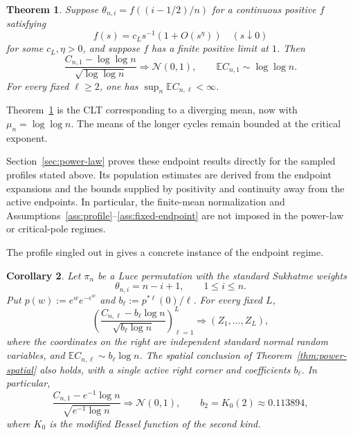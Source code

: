 \documentclass[11pt]{article}
\newtheorem{theorem}{Theorem}[section]
\newtheorem{corollary}[theorem]{Corollary}
\theoremstyle{remark}
\theoremstyle{plain}
\newcommand{\E}{\mathbb E}
\begin{document}
\begin{theorem}
\label{thm:critical-pole}
Suppose $\theta_{n,i}=f((i-1/2)/n)$ for a continuous positive $f$ satisfying
\[
 f(s)=c_Ls^{-1}(1+O(s^\eta))
 \quad(s\downarrow0)
\]
for some $c_L,\eta>0$, and suppose $f$ has a finite positive limit at $1$.
Then
\begin{equation}\label{eq:critical-fixed-clt}
 \frac{C_{n,1}-\log\log n}{\sqrt{\log\log n}}
 \Longrightarrow\mathcal N(0,1),
 \qquad
 \E C_{n,1}\sim\log\log n.
\end{equation}
For every fixed $\ell\ge2$, one has $\sup_n\E C_{n,\ell}<\infty$.
\end{theorem}

Theorem~\ref{thm:critical-pole} is the CLT corresponding to a diverging mean,
now with $\mu_n=\log\log n$.  The means of the longer cycles remain bounded
at the critical exponent.

Section~\ref{sec:power-law} proves these endpoint results directly for
the sampled profiles stated above.  Its population estimates are derived
from the endpoint expansions and the bounds supplied by positivity and
continuity away from the active endpoints.  In particular, the finite-mean
normalization and Assumptions~\ref{ass:profile}--\ref{ass:fixed-endpoint}
are not imposed in the power-law or critical-pole regimes.


The profile singled out in
\cite[Section~5.2]{borga2025permutonlocallimitsluce} gives a concrete instance
of the endpoint regime.

\begin{corollary}\label{cor:sukhatme}
Let $\pi_n$ be a Luce permutation with the standard Sukhatme weights
\[
 \theta_{n,i}=n-i+1,
 \qquad 1\le i\le n.
\]
Put $p(w):=e^we^{-e^w}$ and
$b_\ell:=p^{*\ell}(0)/\ell$.  For every fixed $L$,
\begin{equation}\label{eq:sukhatme-cycle-clt}
 \left(
 \frac{C_{n,\ell}-b_\ell\log n}{\sqrt{b_\ell\log n}}
 \right)_{\ell=1}^L
 \Longrightarrow (Z_1,\ldots,Z_L),
\end{equation}
where the coordinates on the right are independent standard normal random
variables, and $\E C_{n,\ell}\sim b_\ell\log n$.  The spatial conclusion of
Theorem~\ref{thm:power-spatial} also holds, with a single active right corner
and coefficients $b_\ell$.  In particular,
\[
 \frac{C_{n,1}-e^{-1}\log n}{\sqrt{e^{-1}\log n}}
 \Longrightarrow\mathcal N(0,1),
 \qquad
 b_2=K_0(2)\approx0.113894,
\]
where $K_0$ is the modified Bessel function of the second kind.
\end{corollary}
\end{document}
